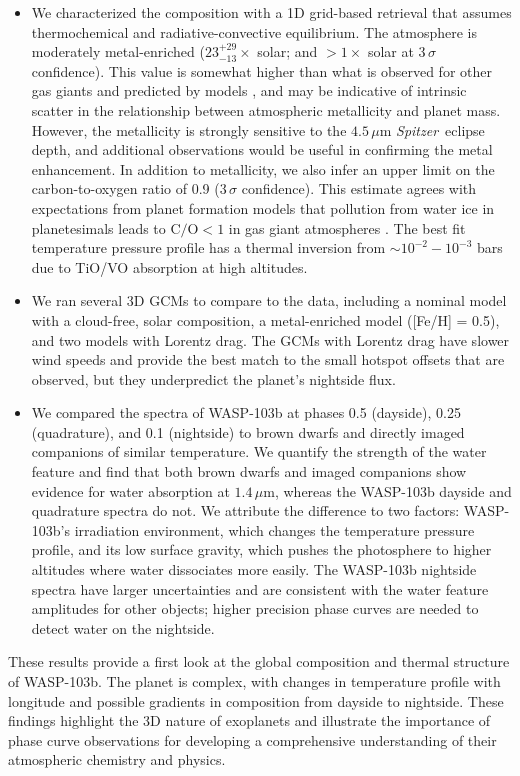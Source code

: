 \documentclass[twocolumn]{aastex61}
\newcommand{\project}[1]{\textsl{#1}}
\newcommand{\Spitzer}{\project{Spitzer}}
\begin{document}
\begin{itemize}
	\item{We characterized the composition with a 1D grid-based retrieval that assumes thermochemical and radiative-convective equilibrium. The atmosphere is moderately metal-enriched ($23^{+29}_{-13}\times$ solar; and $>1\times$ solar at $3\,\sigma$ confidence). This value is somewhat higher than what is observed for other gas giants and predicted by models \citep[e.g.][]{wong04, kreidberg14b, mordasini16}, and may be indicative of intrinsic scatter in the relationship between atmospheric metallicity and planet mass. However, the metallicity is strongly sensitive to the $4.5\,\mu$m \Spitzer\ eclipse depth, and additional observations would be useful in confirming the metal enhancement.  In addition to metallicity, we also infer an upper limit on the carbon-to-oxygen ratio of 0.9 ($3\,\sigma$ confidence). This estimate agrees with expectations from planet formation models that pollution from water ice in planetesimals leads to $\mathrm{C/O} < 1$ in gas giant atmospheres \citep{mordasini16, espinoza17}. The best fit temperature pressure profile has a thermal inversion from $\sim10^{-2} - 10^{-3}$ bars due to TiO/VO absorption at high altitudes.} 
	\item{We ran several 3D GCMs to compare to the data, including a nominal model with a cloud-free, solar composition, a metal-enriched model ([Fe/H] = 0.5), and two models with Lorentz drag. The GCMs with Lorentz drag have slower wind speeds and provide the best match to the small hotspot offsets that are observed, but they underpredict the planet's nightside flux.}
	\item{We compared the spectra of WASP-103b at phases 0.5 (dayside), 0.25 (quadrature), and 0.1 (nightside) to brown dwarfs and directly imaged companions of similar temperature. We quantify the strength of the water feature and find that both brown dwarfs and imaged companions show evidence for water absorption at $1.4\,\mu$m, whereas the WASP-103b dayside and quadrature spectra do not. We attribute the difference to two factors: WASP-103b's irradiation environment, which changes the temperature pressure profile, and its low surface gravity, which pushes the photosphere to higher altitudes where water dissociates more easily. The WASP-103b nightside spectra have larger uncertainties and are consistent with the water feature amplitudes for other objects; higher precision phase curves are needed to detect water on the nightside.}
\end{itemize}

These results provide a first look at the global composition and thermal structure of WASP-103b.  The planet is complex, with changes in temperature profile with longitude and possible gradients in composition from dayside to nightside. These findings highlight the 3D nature of exoplanets and illustrate the importance of phase curve observations for developing a comprehensive understanding of their atmospheric chemistry and physics.
\end{document}
